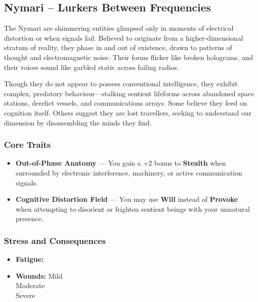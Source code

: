 \subsection*{Nymari – Lurkers Between Frequencies}

The Nymari are shimmering entities glimpsed only in moments of electrical distortion or when signals fail. Believed to originate from a higher-dimensional stratum of reality, they phase in and out of existence, drawn to patterns of thought and electromagnetic noise. Their forms flicker like broken holograms, and their voices sound like garbled static across failing radios.

Though they do not appear to possess conventional intelligence, they exhibit complex, predatory behaviour—stalking sentient lifeforms across abandoned space stations, derelict vessels, and communications arrays. Some believe they feed on cognition itself. Others suggest they are lost travellers, seeking to understand our dimension by disassembling the minds they find.

\subsubsection*{Core Traits}
\begin{itemize}
  \item \textbf{Out-of-Phase Anatomy} — You gain a +2 bonus to \textbf{Stealth} when surrounded by electronic interference, machinery, or active communication signals.

  \item \textbf{Cognitive Distortion Field} — You may use \textbf{Will} instead of \textbf{Provoke} when attempting to disorient or frighten sentient beings with your unnatural presence.
\end{itemize}

\subsubsection*{Stress and Consequences}
\begin{itemize}
  \item \textbf{Fatigue:} \FatigueBox \FatigueBox \FatigueBox
  \item \textbf{Wounds:} 
  Mild \MildWound \MildWound \\
  Moderate \ModerateWound \\
  Severe \SevereWound
\end{itemize}

